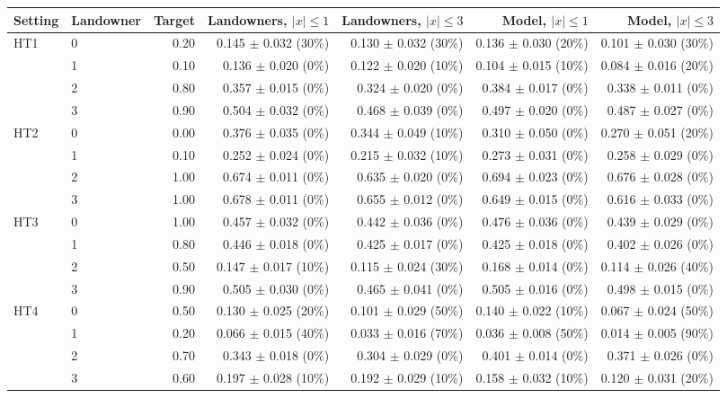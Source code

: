 \begin{tabular}{llrrrrr}
\toprule
Setting & Landowner & Target & Landowners, $|x|\le1$ & Landowners, $|x|\le3$ & Model, $|x|\le1$ & Model, $|x|\le3$ \\
\midrule
HT1 & 0 & 0.20 & 0.145 $\pm$ 0.032 (30\%) & 0.130 $\pm$ 0.032 (30\%) & 0.136 $\pm$ 0.030 (20\%) & 0.101 $\pm$ 0.030 (30\%) \\
 & 1 & 0.10 & 0.136 $\pm$ 0.020 (0\%) & 0.122 $\pm$ 0.020 (10\%) & 0.104 $\pm$ 0.015 (10\%) & 0.084 $\pm$ 0.016 (20\%) \\
 & 2 & 0.80 & 0.357 $\pm$ 0.015 (0\%) & 0.324 $\pm$ 0.020 (0\%) & 0.384 $\pm$ 0.017 (0\%) & 0.338 $\pm$ 0.011 (0\%) \\
 & 3 & 0.90 & 0.504 $\pm$ 0.032 (0\%) & 0.468 $\pm$ 0.039 (0\%) & 0.497 $\pm$ 0.020 (0\%) & 0.487 $\pm$ 0.027 (0\%) \\
\addlinespace
HT2 & 0 & 0.00 & 0.376 $\pm$ 0.035 (0\%) & 0.344 $\pm$ 0.049 (10\%) & 0.310 $\pm$ 0.050 (0\%) & 0.270 $\pm$ 0.051 (20\%) \\
 & 1 & 0.10 & 0.252 $\pm$ 0.024 (0\%) & 0.215 $\pm$ 0.032 (10\%) & 0.273 $\pm$ 0.031 (0\%) & 0.258 $\pm$ 0.029 (0\%) \\
 & 2 & 1.00 & 0.674 $\pm$ 0.011 (0\%) & 0.635 $\pm$ 0.020 (0\%) & 0.694 $\pm$ 0.023 (0\%) & 0.676 $\pm$ 0.028 (0\%) \\
 & 3 & 1.00 & 0.678 $\pm$ 0.011 (0\%) & 0.655 $\pm$ 0.012 (0\%) & 0.649 $\pm$ 0.015 (0\%) & 0.616 $\pm$ 0.033 (0\%) \\
\addlinespace
HT3 & 0 & 1.00 & 0.457 $\pm$ 0.032 (0\%) & 0.442 $\pm$ 0.036 (0\%) & 0.476 $\pm$ 0.036 (0\%) & 0.439 $\pm$ 0.029 (0\%) \\
 & 1 & 0.80 & 0.446 $\pm$ 0.018 (0\%) & 0.425 $\pm$ 0.017 (0\%) & 0.425 $\pm$ 0.018 (0\%) & 0.402 $\pm$ 0.026 (0\%) \\
 & 2 & 0.50 & 0.147 $\pm$ 0.017 (10\%) & 0.115 $\pm$ 0.024 (30\%) & 0.168 $\pm$ 0.014 (0\%) & 0.114 $\pm$ 0.026 (40\%) \\
 & 3 & 0.90 & 0.505 $\pm$ 0.030 (0\%) & 0.465 $\pm$ 0.041 (0\%) & 0.505 $\pm$ 0.016 (0\%) & 0.498 $\pm$ 0.015 (0\%) \\
\addlinespace
HT4 & 0 & 0.50 & 0.130 $\pm$ 0.025 (20\%) & 0.101 $\pm$ 0.029 (50\%) & 0.140 $\pm$ 0.022 (10\%) & 0.067 $\pm$ 0.024 (50\%) \\
 & 1 & 0.20 & 0.066 $\pm$ 0.015 (40\%) & 0.033 $\pm$ 0.016 (70\%) & 0.036 $\pm$ 0.008 (50\%) & 0.014 $\pm$ 0.005 (90\%) \\
 & 2 & 0.70 & 0.343 $\pm$ 0.018 (0\%) & 0.304 $\pm$ 0.029 (0\%) & 0.401 $\pm$ 0.014 (0\%) & 0.371 $\pm$ 0.026 (0\%) \\
 & 3 & 0.60 & 0.197 $\pm$ 0.028 (10\%) & 0.192 $\pm$ 0.029 (10\%) & 0.158 $\pm$ 0.032 (10\%) & 0.120 $\pm$ 0.031 (20\%) \\
\bottomrule
\end{tabular}
